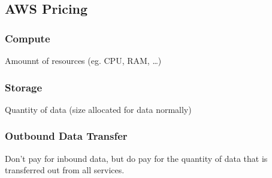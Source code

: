 \documentclass[11pt]{article}
\begin{document}
    \subsection{AWS Pricing}
    \subsubsection{Compute}
    Amounnt of resources (eg. CPU, RAM, \ldots)

    \subsubsection{Storage}
    Quantity of data (size allocated for data normally)


    \subsubsection{Outbound Data Transfer}
    Don't pay for inbound data, but do pay for the quantity of data that is transferred out from all services.
\end{document}

